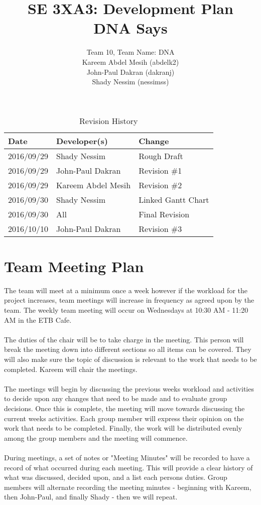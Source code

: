 \documentclass{article}
\title{SE 3XA3: Development Plan\\DNA Says}
\author{Team 10, Team Name: DNA
		\\ Kareem Abdel Mesih (abdelk2)
		\\ John-Paul Dakran (dakranj)
		\\ Shady Nessim (nessimss)
}
\date{}
\begin{document}
\begin{table}[hp]
\caption{Revision History} \label{TblRevisionHistory}
\begin{tabularx}{\textwidth}{llX}
\toprule
\textbf{Date} & \textbf{Developer(s)} & \textbf{Change}\\
\midrule
2016/09/29 & Shady Nessim & Rough Draft\\
2016/09/29 & John-Paul Dakran &  Revision \#1\\
2016/09/29 & Kareem Abdel Mesih &  Revision \#2\\
2016/09/30 & Shady Nessim & Linked Gantt Chart\\
2016/09/30 & All & Final Revision\\
2016/10/10 & John-Paul Dakran & Revision \#3\\
\bottomrule
\end{tabularx}
\end{table}
\newpage
\maketitle
\newpage
\section{Team Meeting Plan} 
The team will meet at a minimum once a week however if the workload for the project increases, team meetings will increase in frequency as agreed upon by the team. The weekly team meeting will occur on Wednesdays at 10:30 AM - 11:20 AM in the ETB Cafe.\\
\\
The duties of the chair will be to take charge in the meeting. This person will break the meeting down into different sections so all items can be covered. They will also make sure the topic of discussion is relevant to the work that needs to be completed. Kareem will chair the meetings.\\
\\
The meetings will begin by discussing the previous weeks workload and activities to decide upon any changes that need to be made and to evaluate group decisions. Once this is complete, the meeting will move towards discussing the current weeks activities. Each group member will express their opinion on the work that needs to be completed. Finally, the work will be distributed evenly among the group members and the meeting will commence.\\
\\
During meetings, a set of notes or "Meeting Minutes" will be recorded to have a record of what occurred during each meeting. This will provide a clear history of what was discussed, decided upon, and a list each persons duties. Group members will alternate recording the meeting minutes - beginning with Kareem, then John-Paul, and finally Shady - then we will repeat.
\end{document}
